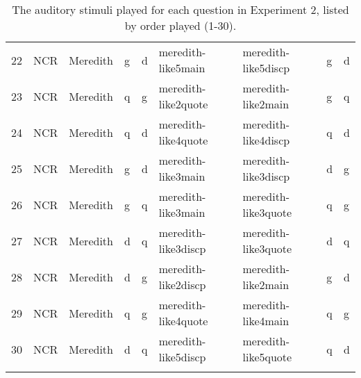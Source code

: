 \begin{table}[t]
\begin{center}
{\begin{tabular}{lllllllll}
22	& NCR	& Meredith	& g	& d	& meredith-like5main	& meredith-like5discp	& g	& d \\
23	& NCR	& Meredith	& q	& g	& meredith-like2quote	& meredith-like2main	& g	& q \\
24	& NCR	& Meredith	& q	& d	& meredith-like4quote	& meredith-like4discp	& q	& d \\
25	& NCR	& Meredith	& g	& d	& meredith-like3main	& meredith-like3discp	& d	& g \\
26	& NCR	& Meredith	& g	& q	& meredith-like3main	& meredith-like3quote	& q	& g \\
27	& NCR	& Meredith	& d	& q	& meredith-like3discp	& meredith-like3quote	& d	& q \\
28	& NCR	& Meredith	& d	& g	& meredith-like2discp	& meredith-like2main	& g	& d \\
29	& NCR	& Meredith	& q	& g	& meredith-like4quote	& meredith-like4main	& q	& g \\
30	& NCR	& Meredith	& d	& q	& meredith-like5discp	& meredith-like5quote	& q	& d \\
   \lspbottomrule
        &      &     	&   	&   	& \hspaceThis{meredith-like2discp}& {meredith-like2discp}&           \\
   
	\end{tabular}
}
	\caption{The auditory stimuli played for each question in Experiment 2, listed by order played (1-30).}\label{tab:appenExp2stimuli}
	\end{center}
\end{table}	




